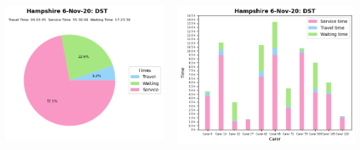 \documentclass[usenames,dvipsnames]{beamer}
\begin{document}
\begin{frame}
\begin{columns}
\begin{minipage}[c][0.45\textheight][c]{\linewidth}
		\end{minipage}
		\begin{minipage}[c][0.45\textheight][c]{\linewidth}
			\centering
			\includegraphics[width=1\linewidth]{figures/6_Nov_20_Hampshire_time_info_dst}
		\end{minipage}
		\begin{minipage}[c][0.45\textheight][c]{\linewidth}
			\vspace{5mm}
			\centering
			\includegraphics[width=1\linewidth]{figures/6_Nov_20_Hampshire_workload_dst}
		\end{minipage}
	\end{columns}
\end{frame}
\end{document}
